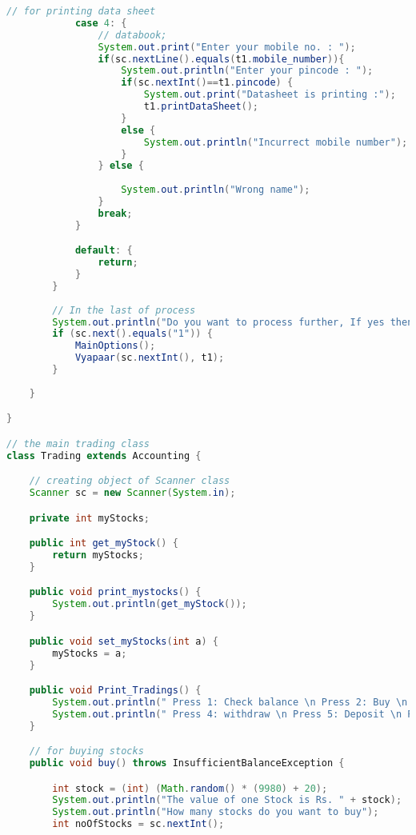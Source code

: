 \documentclass[]{article}
\begin{document}
\begin{lstlisting}[language=java, caption= Java Mini Project ]
            // for printing data sheet
            case 4: {
                // databook;
                System.out.print("Enter your mobile no. : ");
                if(sc.nextLine().equals(t1.mobile_number)){
                    System.out.println("Enter your pincode : ");
                    if(sc.nextInt()==t1.pincode) {
                        System.out.print("Datasheet is printing :");
                        t1.printDataSheet();
                    }
                    else {
                        System.out.println("Incurrect mobile number");
                    }
                } else {
                    
                    System.out.println("Wrong name");
                }
                break;
            }

            default: {
                return;
            }
        }
        
        // In the last of process
        System.out.println("Do you want to process further, If yes then press 1 otherwise anything");
        if (sc.next().equals("1")) {
            MainOptions();
            Vyapaar(sc.nextInt(), t1);
        }
        
    }

}

// the main trading class
class Trading extends Accounting {

    // creating object of Scanner class
    Scanner sc = new Scanner(System.in);

    private int myStocks;

    public int get_myStock() {
        return myStocks;
    }

    public void print_mystocks() {
        System.out.println(get_myStock());
    }

    public void set_myStocks(int a) {
        myStocks = a;
    }

    public void Print_Tradings() {
        System.out.println(" Press 1: Check balance \n Press 2: Buy \n Press 3: Sell");
        System.out.println(" Press 4: withdraw \n Press 5: Deposit \n Press 6: Main menu \n Press 7: Exit");
    }

    // for buying stocks
    public void buy() throws InsufficientBalanceException {

        int stock = (int) (Math.random() * (9980) + 20);
        System.out.println("The value of one Stock is Rs. " + stock);
        System.out.println("How many stocks do you want to buy");
        int noOfStocks = sc.nextInt();


\end{lstlisting}
\end{document}
